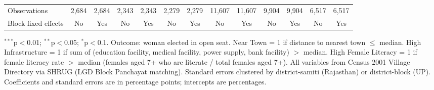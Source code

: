 \begin{adjustbox}{max width=\linewidth}
\begin{threeparttable}[b]
\begin{tabular}{lcccccccccccc}
         Observations                                   & 2,684        & 2,684 & 2,343       & 2,343 & 2,279        & 2,279       & 11,607       & 11,607     & 9,904        & 9,904 & 6,517        & 6,517\\
         Block fixed effects                            & No           & Yes   & No          & Yes   & No           & Yes         & No           & Yes        & No           & Yes   & No           & Yes\\
         \bottomrule
      \end{tabular}

      \begin{tablenotes}
         \item $^{***}$p$<$0.01; $^{**}$p$<$0.05; $^{*}$p$<$0.1. Outcome: woman elected in open seat. Near Town = 1 if distance to nearest town $\leq$ median. High Infrastructure = 1 if sum of (education facility, medical facility, power supply, bank facility) $>$ median. High Female Literacy = 1 if female literacy rate $>$ median (females aged 7+ who are literate / total females aged 7+). All variables from Census 2001 Village Directory via SHRUG (LGD Block Panchayat matching). Standard errors clustered by district-samiti (Rajasthan) or district-block (UP). Coefficients and standard errors are in percentage points; intercepts are percentages.
      \end{tablenotes}
   \end{threeparttable}
\end{adjustbox}
\par\endgroup



